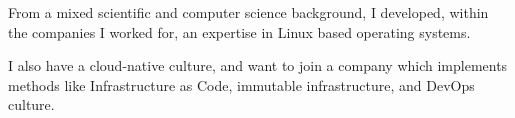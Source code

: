 

\begin{cvparagraph}

From a mixed scientific and computer science background, I developed, within the companies I worked for, an expertise in Linux based operating systems.


I also have a cloud-native culture, and want to join a company which implements methods like Infrastructure as Code, immutable infrastructure, and DevOps culture.
\end{cvparagraph}
